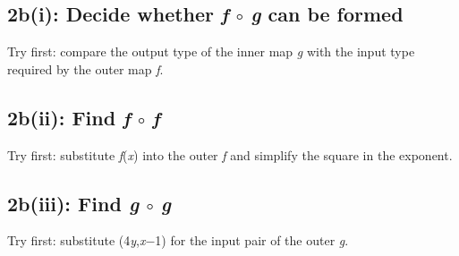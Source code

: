 \documentclass[11pt]{article}
\begin{document}
\begin{keepsection}
\begin{keepsection}
\end{keepsection}

\begin{keepsection}
\subsection{2b(i): Decide whether \textit{f} \ensuremath{\circ} \textit{g} can be formed}

Try first: compare the output type of the inner map \textit{g} with the input type required by the outer map \textit{f}.

\end{keepsection}

\begin{keepsection}
\subsection{2b(ii): Find \textit{f} \ensuremath{\circ} \textit{f}}

Try first: substitute \textit{f}(\textit{x}) into the outer \textit{f} and simplify the square in the exponent.

\end{keepsection}

\begin{keepsection}
\subsection{2b(iii): Find \textit{g} \ensuremath{\circ} \textit{g}}

Try first: substitute (4\textit{y},\textit{x}\ensuremath{-}1) for the input pair of the outer \textit{g}.

\end{keepsection}
\end{keepsection}
\end{document}
